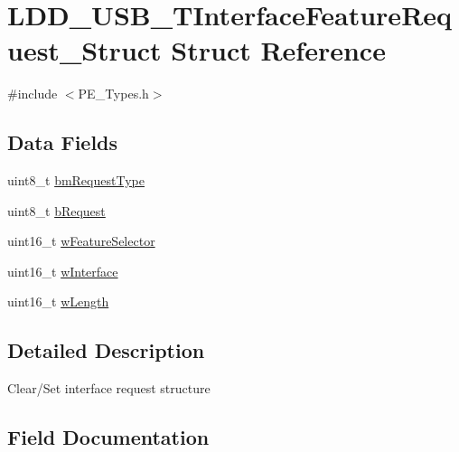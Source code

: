 \hypertarget{struct_l_d_d___u_s_b___t_interface_feature_request___struct}{}\section{L\+D\+D\+\_\+\+U\+S\+B\+\_\+\+T\+Interface\+Feature\+Request\+\_\+\+Struct Struct Reference}
\label{struct_l_d_d___u_s_b___t_interface_feature_request___struct}


{\ttfamily \#include $<$P\+E\+\_\+\+Types.\+h$>$}

\subsection*{Data Fields}
\begin{DoxyCompactItemize}
\item 
uint8\+\_\+t \hyperlink{struct_l_d_d___u_s_b___t_interface_feature_request___struct_a72b3bba6305033e1951402155005aa7d}{bm\+Request\+Type}
\item 
uint8\+\_\+t \hyperlink{struct_l_d_d___u_s_b___t_interface_feature_request___struct_a5e8ab52b3b2c853ee77a5e2207aaf01b}{b\+Request}
\item 
uint16\+\_\+t \hyperlink{struct_l_d_d___u_s_b___t_interface_feature_request___struct_aa1c03cac467205263f3f973f580dca11}{w\+Feature\+Selector}
\item 
uint16\+\_\+t \hyperlink{struct_l_d_d___u_s_b___t_interface_feature_request___struct_afc1da433b4a02f8c6a6ed6ce8b3065da}{w\+Interface}
\item 
uint16\+\_\+t \hyperlink{struct_l_d_d___u_s_b___t_interface_feature_request___struct_a5f54f1e83024342d9d63aad374a117ba}{w\+Length}
\end{DoxyCompactItemize}


\subsection{Detailed Description}
Clear/\+Set interface request structure 

\subsection{Field Documentation}
\hypertarget{struct_l_d_d___u_s_b___t_interface_feature_request___struct_a72b3bba6305033e1951402155005aa7d}{}
